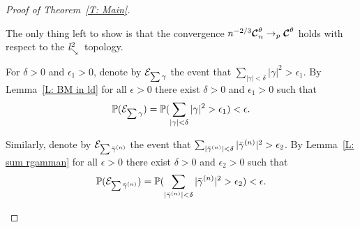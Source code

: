 \begin{proof}[Proof of Theorem~\ref{T: Main}]
	\begin{proofpart}
	The only thing left to show is that the convergence $n^{-2 / 3} \boldsymbol{\mathcal{C}}^{\theta}_n \rightarrow_p \boldsymbol{\mathcal{C}}^{\theta}$ holds with respect to the $\mathit{l}^2_{\searrow}$~topology.
	
	For $\delta > 0$ and $\epsilon_1 > 0$, denote by $\mathcal{E}_{\sum\gamma}$ the event that $\sum_{|\gamma| < \delta}|\gamma|^2 > \epsilon_1$.
	By Lemma~\ref{L: BM in ld} for all $\epsilon > 0$ there exist $\delta > 0$ and $\epsilon_1 > 0$ such that
	\begin{equation}
	\mathbb{P}(\mathcal{E}_{\sum\gamma}) = \mathbb{P}( \sum_{|\gamma| < \delta}|\gamma|^2 > \epsilon_1 ) < \epsilon.
	\end{equation}
	
	Similarly, denote by $\mathcal{E}_{\sum\bar{\gamma}^{(n)}}$ the event that $\sum_{|\bar{\gamma}^{(n)}| < \delta}|\bar{\gamma}^{(n)}|^2 > \epsilon_2$.
	By Lemma~\ref{L: sum rgamman} for all $\epsilon > 0$ there exist $\delta > 0$ and $\epsilon_2 > 0$ such that
	\begin{equation}
	\mathbb{P}(\mathcal{E}_{\sum\bar{\gamma}^{(n)}}) = \mathbb{P}( \sum_{|\bar{\gamma}^{(n)}| < \delta}|\bar{\gamma}^{(n)}|^2 > \epsilon_2 ) < \epsilon.
	\end{equation}
	

\end{proofpart}
\end{proof}
